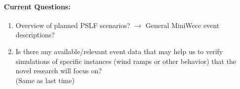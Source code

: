 \documentclass[12pt]{article}
\begin{document}
	\paragraph{Current Questions:}
	\begin{enumerate}
		
		
		\item Overview of planned PSLF scenarios? $\rightarrow$ General MiniWecc event descriptions?
		
		\item Is there any available/relevant event data that may help us to verify simulations of specific instances (wind ramps or other behavior) that the novel research will focus on?\\ (Same as last time)
	\end{enumerate}
\end{document}
